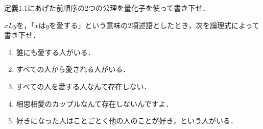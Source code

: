 \documentclass[11pt,a4paper]{jsarticle}
\begin{document}
\begin{exercise}
 定義1.1にあげた前順序の2つの公理を量化子を使って書き下せ．
\end{exercise}





\begin{exercise}
 $xLy$を，「$x$は$y$を愛する」という意味の2項述語としたとき，次を論理式によって書き下せ．
\begin{enumerate}
 \item 誰にも愛する人がいる．
 \item すべての人から愛される人がいる．
 \item すべての人を愛する人なんて存在しない．
 \item 相思相愛のカップルなんて存在しないんですよ．
 \item 好きになった人はことごとく他の人のことが好き，という人がいる．
\end{enumerate}

\end{exercise}
\end{document}
